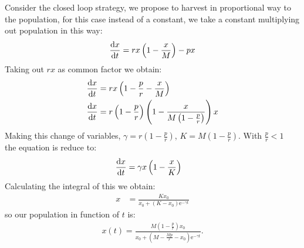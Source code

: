 Consider the closed loop strategy, we propose to harvest in proportional way to the population, for this case instead of a constant, we take a constant multiplying out population in this way:
\begin{equation}
\frac{\mathrm{d} x}{{\mathrm{d} t}}=rx\left(1-\frac{x}{M}\right)-px \label{eq: PropHarvest}
\end{equation}
Taking out $rx$ as common factor we obtain:
\begin{align}
\frac{\mathrm{d} x}{{\mathrm{d} t}}&=rx\left(1-\frac{p}{r}-\frac{x}{M}\right) \\
\frac{\mathrm{d} x}{{\mathrm{d} t}}&=r\left(1-\frac{p}{r}\right)\left(1-\frac{x}{M\left(1-\frac{p}{r}\right)}\right)x
\end{align}
Making this change of variables,
$\gamma=r\left(1-\frac{p}{r}\right)$, $K=M\left(1-\frac{p}{r}\right)$. With $\frac{p}{r}<1$\\
the equation is reduce to:
\begin{align}
\frac{\mathrm{d} x}{{\mathrm{d} t}}&=\gamma x\left(1-\frac{x}{K}\right)
\end{align}
Calculating the integral of this we obtain:
\begin{align}
x&=\frac{Kx_0}{x_0+\left(K-x_0\right)\mathrm{e}^{-\gamma t}}
\end{align}
so our population in function of $t$ is:
\begin{align}
x(t)=\frac{M\left(1-\frac{p}{r}\right)x_0}{x_0+\left(M-\frac{Mp}{r}-x_0\right)\mathrm{e}^{-\gamma t}}. \label{eq: Proportional Population}
\end{align}